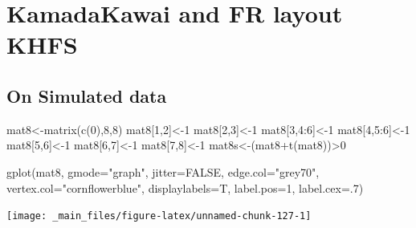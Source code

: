 \documentclass[
  notitlepage,
  onecolumn,
  openany]{book}
\newenvironment{Shaded}{\begin{snugshade}}{\end{snugshade}}
\newcommand{\AttributeTok}[1]{\textcolor[rgb]{0.77,0.63,0.00}{#1}}
\newcommand{\ConstantTok}[1]{\textcolor[rgb]{0.00,0.00,0.00}{#1}}
\newcommand{\DecValTok}[1]{\textcolor[rgb]{0.00,0.00,0.81}{#1}}
\newcommand{\FunctionTok}[1]{\textcolor[rgb]{0.00,0.00,0.00}{#1}}
\newcommand{\NormalTok}[1]{#1}
\newcommand{\OtherTok}[1]{\textcolor[rgb]{0.56,0.35,0.01}{#1}}
\newcommand{\SpecialCharTok}[1]{\textcolor[rgb]{0.00,0.00,0.00}{#1}}
\newcommand{\StringTok}[1]{\textcolor[rgb]{0.31,0.60,0.02}{#1}}
\begin{document}
\hypertarget{kamadakawai-and-fr-layout-khfs}{%
\section{KamadaKawai and FR layout KHFS}\label{kamadakawai-and-fr-layout-khfs}}

\hypertarget{on-simulated-data}{%
\subsection{On Simulated data}\label{on-simulated-data}}

\begin{Shaded}
\begin{Highlighting}[]
\NormalTok{mat8}\OtherTok{\textless{}{-}}\FunctionTok{matrix}\NormalTok{(}\FunctionTok{c}\NormalTok{(}\DecValTok{0}\NormalTok{),}\DecValTok{8}\NormalTok{,}\DecValTok{8}\NormalTok{)}
\NormalTok{mat8[}\DecValTok{1}\NormalTok{,}\DecValTok{2}\NormalTok{]}\OtherTok{\textless{}{-}}\DecValTok{1}
\NormalTok{mat8[}\DecValTok{2}\NormalTok{,}\DecValTok{3}\NormalTok{]}\OtherTok{\textless{}{-}}\DecValTok{1}
\NormalTok{mat8[}\DecValTok{3}\NormalTok{,}\DecValTok{4}\SpecialCharTok{:}\DecValTok{6}\NormalTok{]}\OtherTok{\textless{}{-}}\DecValTok{1}
\NormalTok{mat8[}\DecValTok{4}\NormalTok{,}\DecValTok{5}\SpecialCharTok{:}\DecValTok{6}\NormalTok{]}\OtherTok{\textless{}{-}}\DecValTok{1}
\NormalTok{mat8[}\DecValTok{5}\NormalTok{,}\DecValTok{6}\NormalTok{]}\OtherTok{\textless{}{-}}\DecValTok{1}
\NormalTok{mat8[}\DecValTok{6}\NormalTok{,}\DecValTok{7}\NormalTok{]}\OtherTok{\textless{}{-}}\DecValTok{1}
\NormalTok{mat8[}\DecValTok{7}\NormalTok{,}\DecValTok{8}\NormalTok{]}\OtherTok{\textless{}{-}}\DecValTok{1}
\NormalTok{mat8s}\OtherTok{\textless{}{-}}\NormalTok{(mat8}\SpecialCharTok{+}\FunctionTok{t}\NormalTok{(mat8))}\SpecialCharTok{\textgreater{}}\DecValTok{0}

\FunctionTok{gplot}\NormalTok{(mat8, }
      \AttributeTok{gmode=}\StringTok{"graph"}\NormalTok{,}
      \AttributeTok{jitter=}\ConstantTok{FALSE}\NormalTok{,}
      \AttributeTok{edge.col=}\StringTok{"grey70"}\NormalTok{,}
      \AttributeTok{vertex.col=}\StringTok{"cornflowerblue"}\NormalTok{,}
      \AttributeTok{displaylabels=}\NormalTok{T,}
      \AttributeTok{label.pos=}\DecValTok{1}\NormalTok{,}
      \AttributeTok{label.cex=}\NormalTok{.}\DecValTok{7}\NormalTok{)}
\end{Highlighting}
\end{Shaded}

\begin{center}\texttt{[image: \_main\_files/figure-latex/unnamed-chunk-127-1]} \end{center}
\end{document}
